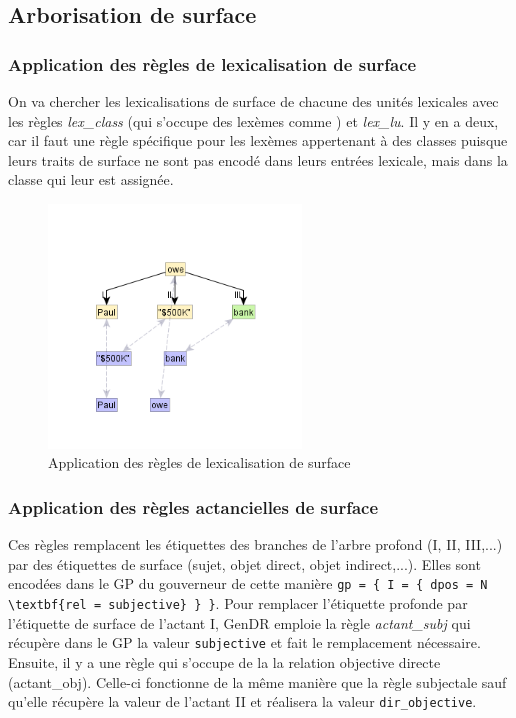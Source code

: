 \subsection{Arborisation de surface}

\subsubsection{Application des règles de lexicalisation de surface}

On va chercher les lexicalisations de surface de chacune des unités lexicales avec les règles \emph{lex\_class} (qui s'occupe des lexèmes comme ) et \emph{lex\_lu}. Il y en a deux, car il faut une règle spécifique pour les lexèmes appertenant à des classes puisque leurs traits de surface ne sont pas encodé dans leurs entrées lexicale, mais dans la classe qui leur est assignée.

\begin{figure}[htb]
	\centering
	\includegraphics[width=0.6\textwidth, trim = {0cm 13mm 0cm 2cm},clip]{ch3/figs/rsyntslexicalisation1.png}
	\caption{Application des règles de lexicalisation de surface}
	\label{fig:lexsurf}
\end{figure}

\subsubsection{Application des règles actancielles de surface}
Ces règles remplacent les étiquettes des branches de l'arbre profond (I, II, III,...) par des étiquettes de surface (sujet, objet direct, objet indirect,...). Elles sont encodées dans le \ac{GP} du gouverneur de cette manière \lstinline|gp = { I = { dpos = N \textbf{rel = subjective} } }|. Pour remplacer l'étiquette profonde par l'étiquette de surface de l'actant I, GenDR emploie la règle \emph{actant\_subj} qui récupère dans le \ac{GP} la valeur \texttt{subjective} et fait le remplacement nécessaire. Ensuite, il y a une règle qui s'occupe de la la relation objective directe (actant\_obj). Celle-ci fonctionne de la même manière que la règle subjectale sauf qu'elle récupère la valeur de l'actant II et réalisera la valeur \texttt{dir\_objective}. 


